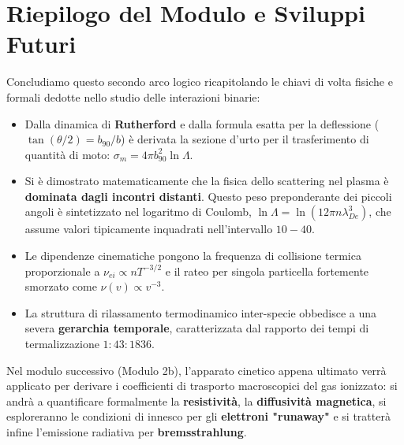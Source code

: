 \section{Riepilogo del Modulo e Sviluppi Futuri}

Concludiamo questo secondo arco logico ricapitolando le chiavi di volta fisiche e formali dedotte nello studio delle interazioni binarie:
\begin{itemize}
\item Dalla dinamica di \textbf{Rutherford} e dalla formula esatta per la deflessione ($\tan(\theta/2) = b_{90}/b$) è derivata la sezione d'urto per il trasferimento di quantità di moto: $\sigma_m = 4\pi b_{90}^2 \ln \Lambda$.
\item Si è dimostrato matematicamente che la fisica dello scattering nel plasma è \textbf{dominata dagli incontri distanti}. Questo peso preponderante dei piccoli angoli è sintetizzato nel logaritmo di Coulomb, $\ln \Lambda = \ln(12\pi n \lambda_{De}^3)$, che assume valori tipicamente inquadrati nell'intervallo $10-40$.
\item Le dipendenze cinematiche pongono la frequenza di collisione termica proporzionale a $\nu_{ei} \propto n T^{-3/2}$ e il rateo per singola particella fortemente smorzato come $\nu(v) \propto v^{-3}$.
\item La struttura di rilassamento termodinamico inter-specie obbedisce a una severa \textbf{gerarchia temporale}, caratterizzata dal rapporto dei tempi di termalizzazione $1 : 43 : 1836$.
\end{itemize}

Nel modulo successivo (Modulo 2b), l'apparato cinetico appena ultimato verrà applicato per derivare i coefficienti di trasporto macroscopici del gas ionizzato: si andrà a quantificare formalmente la \textbf{resistività}, la \textbf{diffusività magnetica}, si esploreranno le condizioni di innesco per gli \textbf{elettroni "runaway"} e si tratterà infine l'emissione radiativa per \textbf{bremsstrahlung}.